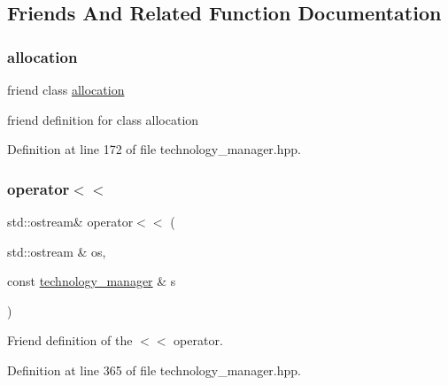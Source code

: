 \subsection{Friends And Related Function Documentation}
\mbox{\label{classtechnology__manager_a2dc219c556df071c0061c3e9ddfa1dca}} 
\subsubsection{\texorpdfstring{allocation}{allocation}}
{\footnotesize\ttfamily friend class \hyperlink{classallocation}{allocation}\hspace{0.3cm}{\ttfamily [friend]}}



friend definition for class allocation 



Definition at line 172 of file technology\+\_\+manager.\+hpp.

\mbox{\label{classtechnology__manager_a7f3288b8143532843313a11ac7d53eda}} 
\subsubsection{\texorpdfstring{operator$<$$<$}{operator<<}\hspace{0.1cm}{\footnotesize\ttfamily [1/2]}}
{\footnotesize\ttfamily std\+::ostream\& operator$<$$<$ (\begin{DoxyParamCaption}\item[{std\+::ostream \&}]{os,  }\item[{const \hyperlink{classtechnology__manager}{technology\+\_\+manager} \&}]{s }\end{DoxyParamCaption})\hspace{0.3cm}{\ttfamily [friend]}}



Friend definition of the $<$$<$ operator. 



Definition at line 365 of file technology\+\_\+manager.\+hpp.


